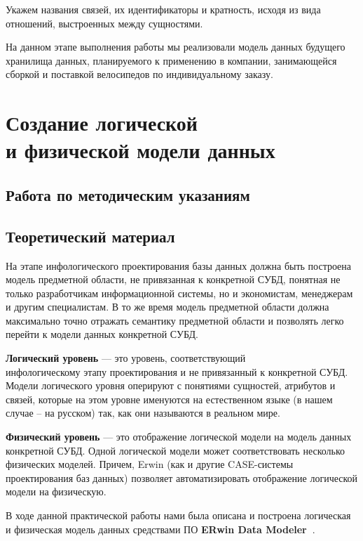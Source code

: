\documentclass[a4paper,14pt]{extarticle}
\newcommand{\erdatamodaler}{\textbf{ERwin Data Modeler~}}
\newcommand{\methodsection}{Работа по методическим указаниям~}
\begin{document}
Укажем названия связей, их идентификаторы и кратность, исходя из вида отношений, выстроенных между сущностями.

На данном этапе выполнения работы мы реализовали модель данных будущего хранилища данных, планируемого к применению в компании, занимающейся сборкой и поставкой велосипедов по индивидуальному заказу.

\section{Создание логической\\и физической модели данных}
\subsection{\methodsection}
\subsection*{Теоретический материал}
На этапе {инфологического} проектирования базы данных должна быть построена
модель предметной области, не привязанная к конкретной СУБД, понятная не только
разработчикам информационной системы, но и экономистам, менеджерам и другим
специалистам. В то же время модель предметной области должна максимально точно
отражать семантику предметной области и позволять легко перейти к модели данных
конкретной СУБД.

\textbf{Логический уровень} --- это уровень, соответствующий \\инфологическому этапу проектирования
и не привязанный к конкретной СУБД. Модели логического уровня оперируют с
понятиями сущностей, атрибутов и связей, которые на этом уровне именуются на
естественном языке (в нашем случае – на русском) так, как они называются в
реальном мире.

\textbf{Физический уровень} --- это отображение логической модели на модель данных
конкретной СУБД. Одной логической модели может соответствовать несколько
физических моделей. Причем, Erwin (как и другие CASE-системы проектирования баз
данных) позволяет автоматизировать отображение логической модели на физическую.


В ходе данной практической работы нами была описана и построена логическая и физическая модель данных средствами ПО \erdatamodaler.
\end{document}
